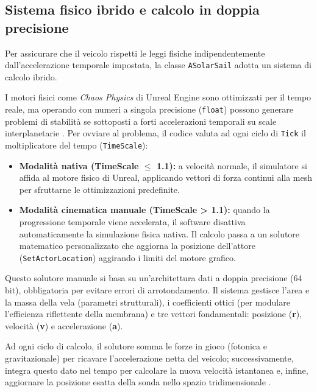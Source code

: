 
\subsection{Sistema fisico ibrido e calcolo in doppia precisione}

Per assicurare che il veicolo rispetti le leggi fisiche indipendentemente dall'accelerazione temporale impostata, la classe \lstinline|ASolarSail| adotta un sistema di calcolo ibrido.

I motori fisici come \textit{Chaos Physics} di Unreal Engine sono ottimizzati per il tempo reale, ma operando con numeri a singola precisione (\lstinline|float|) possono generare problemi di stabilità se sottoposti a forti accelerazioni temporali su scale interplanetarie \cite{epicgames_unrealengine}. Per ovviare al problema, il codice valuta ad ogni ciclo di \lstinline|Tick| il moltiplicatore del tempo (\lstinline|TimeScale|):

\begin{itemize}
    \item \textbf{Modalità nativa (TimeScale $\le$ 1.1):} a velocità normale, il simulatore si affida al motore fisico di Unreal, applicando vettori di forza continui alla mesh per sfruttarne le ottimizzazioni predefinite.
    \item \textbf{Modalità cinematica manuale (TimeScale > 1.1):} quando la progressione temporale viene accelerata, il software disattiva automaticamente la simulazione fisica nativa. Il calcolo passa a un solutore matematico personalizzato che aggiorna la posizione dell'attore (\lstinline|SetActorLocation|) aggirando i limiti del motore grafico.
\end{itemize}

Questo solutore manuale si basa su un'architettura dati a doppia precisione (64 bit), obbligatoria per evitare errori di arrotondamento. Il sistema gestisce l'area e la massa della vela (parametri strutturali), i coefficienti ottici (per modulare l'efficienza riflettente della membrana) e tre vettori fondamentali: posizione (\textbf{r}), velocità (\textbf{v}) e accelerazione (\textbf{a}). 

Ad ogni ciclo di calcolo, il solutore somma le forze in gioco (fotonica e gravitazionale) per ricavare l'accelerazione netta del veicolo; successivamente, integra questo dato nel tempo per calcolare la nuova velocità istantanea e, infine, aggiornare la posizione esatta della sonda nello spazio tridimensionale \cite{curtis2005orbital}.


